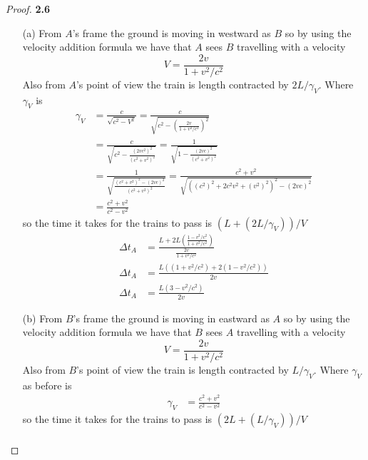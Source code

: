 \documentclass[11pt]{article}
\theoremstyle{definition}
\begin{document}
    \begin{proof}{\textbf{2.6}}
        \begin{itemize}
            \item [(a)] From $A$'s frame the ground is moving in westward as $B$ so by
            using the velocity addition formula we have that $A$ sees $B$ travelling
            with a velocity
            $$V = \frac{2v}{1 + v^2/c^2}$$
            Also from $A$'s point of view the train is length contracted by $2L/\gamma_V$.
            Where $\gamma_V$ is 
            \begin{align*}
                \gamma_V &= \frac{c}{\sqrt{c^2 - V^2}}
                    = \frac{c}{\sqrt{c^2 - (\frac{2v}{1 + v^2/c^2})^2}}\\
                    &= \frac{c}{\sqrt{c^2 - \frac{(2vc^2)^2}{(c^2 + v^2)^2}}}
                    = \frac{1}{\sqrt{1 - \frac{(2vc)^2}{(c^2 + v^2)^2}}}\\
                    &= \frac{1}{\sqrt{\frac{(c^2+v^2)^2 - (2vc)^2}{(c^2 + v^2)^2}}}
                    = \frac{c^2 + v^2}{\sqrt{((c^2)^2+2c^2v^2+(v^2)^2)^2 - (2vc)^2}}\\
                    &= \frac{c^2 + v^2}{c^2 -v^2}
                \end{align*}
            so the time it takes for the trains to pass is $(L + (2L/\gamma_V))/V$
            \begin{align*}
                \Delta t_A &= \frac{L + 2L(\frac{1 - v^2/c^2}{1 + v^2/c^2})}
                {\frac{2v}{1 + v^2/c^2}}\\
                \Delta t_A &= \frac{L((1 + v^2/c^2) + 2(1 - v^2/c^2))}{2v}\\
                \Delta t_A &= \frac{L(3 - v^2/c^2)}{2v}
            \end{align*}
            \item [(b)] From $B$'s frame the ground is moving in eastward as $A$ so by
            using the velocity addition formula we have that $B$ sees $A$ travelling
            with a velocity
            $$V = \frac{2v}{1 + v^2/c^2}$$
            Also from $B$'s point of view the train is length contracted by $L/\gamma_V$.
            Where $\gamma_V$ as before is 
            \begin{align*}
                \gamma_V &= \frac{c^2 + v^2}{c^2 -v^2}
                \end{align*}
            so the time it takes for the trains to pass is $(2L + (L/\gamma_V))/V$
            \begin{align*}

\end{align*}
\end{itemize}
\end{proof}
\end{document}
